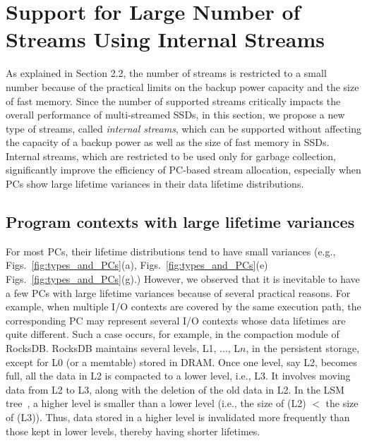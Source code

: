\section{Support for Large Number of Streams Using Internal Streams}
As explained in Section 2.2, the number of streams is restricted to a small number 
because of the practical limits on the backup power capacity and the size of fast memory.  
Since the number of supported streams critically impacts the overall performance 
of multi-streamed SSDs, in this section, we propose a new type of streams, 
called {\it internal streams}, which can be
supported without affecting the capacity of a backup power as well as 
the size of fast memory in SSDs.   
Internal streams, which are restricted to be used only for garbage collection, 
significantly improve the efficiency of PC-based stream allocation,
{\color{blue}
especially when PCs show large lifetime variances in their data lifetime
distributions.
}

\subsection{Program contexts with large lifetime variances}
For most PCs, their lifetime distributions tend to have small variances
(e.g., Figs.~\ref{fig:types_and_PCs}(a), Figs.~\ref{fig:types_and_PCs}(e)
Figs.~\ref{fig:types_and_PCs}(g).)
However, we observed that 
{\color{blue}
it is inevitable to have a few PCs with large lifetime variances 
because of several practical reasons.
}
For example, when multiple I/O contexts are covered by the same execution path, 
the corresponding PC may represent several I/O contexts whose data lifetimes are quite different.   
Such a case occurs, for example, 
in the compaction module of RocksDB.
RocksDB maintains
several levels, L1, ..., L$n$, in the persistent storage, except for L0 (or a
memtable) stored in DRAM.  Once one level, say L2, becomes full, all the data
in L2 is compacted to a lower level, i.e., L3.  It involves moving data from L2
to L3, along with the deletion of the old data in L2.  In the
LSM tree~\cite{LSM}, a higher level is smaller than a lower level 
(i.e., the size of (L2) $<$ the size of (L3)). 
Thus, data stored in a higher level is invalidated more frequently than those kept
in lower levels, thereby having shorter lifetimes.


